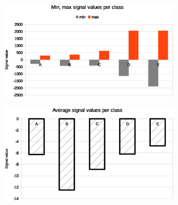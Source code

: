 \documentclass[12pt]{article}
\begin{document}
\begin{figure}
\begin{subfigure}{.5\textwidth}
  \centering
  \includegraphics[width=.8\linewidth]{figures/minmax.eps}
\end{subfigure}%
\begin{subfigure}{.5\textwidth}
  \centering
  \includegraphics[width=.8\linewidth]{figures/mean.eps}
\end{subfigure}


\end{figure}
\end{document}
